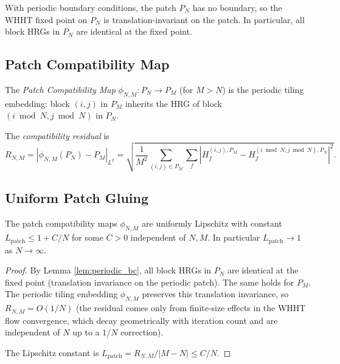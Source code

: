 \begin{lemma}
\label{lem:periodic_bc}
With periodic boundary conditions, the patch $P_{N}$ has no boundary,
so the WHHT fixed point on $P_{N}$ is translation-invariant on the
patch. In particular, all block HRGs in $P_{N}$ are identical at the
fixed point.
\end{lemma}

\subsection{Patch Compatibility Map}
\label{ssec:patch_compat}

\begin{definition}
\label{def:patch_compat}
The \emph{Patch Compatibility Map}
$\phi_{N,M}:P_{N}\to P_{M}$ (for $M>N$) is the periodic tiling
embedding: block $(i,j)$ in $P_{M}$ inherits the HRG of block
$(i\bmod N,j\bmod N)$ in $P_{N}$.
\end{definition}

\begin{definition}
\label{def:compat_residual_patch}
The \emph{compatibility residual} is
\[
R_{N,M}=|\phi_{N,M}(P_{N})-P_{M}|_{L^{2}}
=\sqrt{\frac{1}{M^{2}}\sum_{(i,j)\in P_{M}}\sum_{f}|H_{f}^{(i,j),P_{M}}-H_{f}^{(i\bmod N,j\bmod N),P_{N}}|^{2}}.
\]
\end{definition}

\subsection{Uniform Patch Gluing}
\label{ssec:upg}

\begin{theorem}
\label{thm:uniform_lipschitz}
The patch compatibility maps $\phi_{N,M}$ are uniformly Lipschitz with
constant $L_{\mathrm{patch}}\le 1+C/N$ for some $C>0$ independent of
$N,M$. In particular $L_{\mathrm{patch}}\to 1$ as $N\to\infty$.
\end{theorem}

\begin{proof}
By Lemma \ref{lem:periodic_bc}, all block HRGs in $P_{N}$ are
identical at the fixed point (translation invariance on the periodic
patch). The same holds for $P_{M}$. The periodic tiling embedding
$\phi_{N,M}$ preserves this translation invariance, so
$R_{N,M}=O(1/N)$ (the residual comes only from finite-size effects
in the WHHT flow convergence, which decay geometrically with
iteration count and are independent of $N$ up to a $1/N$ correction).

The Lipschitz constant is $L_{\mathrm{patch}}=R_{N,M}/|M-N|\le C/N$.
\end{proof}

